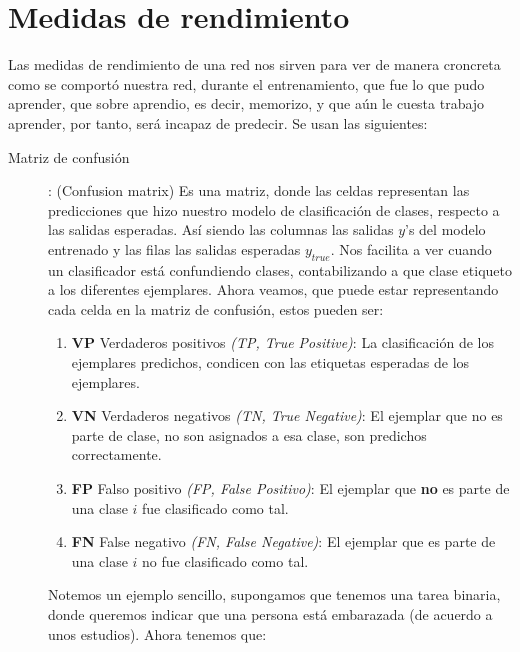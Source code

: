 \section{Medidas de rendimiento}

Las medidas de rendimiento de una red nos sirven para ver de manera croncreta como se comportó nuestra red, durante el entrenamiento, que fue lo que pudo aprender, que sobre aprendio, es decir, memorizo, y que aún le cuesta trabajo aprender, por tanto, será incapaz de predecir. Se usan las siguientes:

\begin{description}
 \item [Matriz de confusión]: (Confusion matrix)
 Es una matriz, donde las celdas representan las predicciones que hizo nuestro modelo de clasificación de clases, respecto a las salidas esperadas. Así siendo las columnas las salidas $y$'s del modelo entrenado y las filas las salidas esperadas $y_{true}$. 
 Nos facilita a ver cuando un clasificador está confundiendo clases, contabilizando a que clase etiqueto a los diferentes ejemplares. Ahora veamos, que puede estar representando cada celda en la matriz de confusión, estos pueden ser:
 \begin{enumerate}
  \item \textbf{VP} Verdaderos positivos \emph{(TP, True Positive)}: La clasificación de los ejemplares predichos, condicen con las etiquetas esperadas de los ejemplares. 
  
  \item \textbf{VN} Verdaderos negativos \emph{(TN, True Negative)}: El ejemplar que no es parte de clase, no son asignados a esa clase, son predichos correctamente.
  
  \item \textbf{FP} Falso positivo \emph{(FP, False Positivo)}: El ejemplar que \textbf{no} es parte de una clase $i$ fue clasificado como tal.
  
  \item \textbf{FN} False negativo  \emph{(FN, False Negative)}: El ejemplar que es parte de una clase $i$ no fue clasificado como tal. 
 \end{enumerate}

  \begin{example}
   Notemos un ejemplo sencillo, supongamos que tenemos una tarea binaria, donde queremos indicar que una persona está
   embarazada (de acuerdo a unos estudios). Ahora tenemos que:
   


\end{example}
\end{description}
